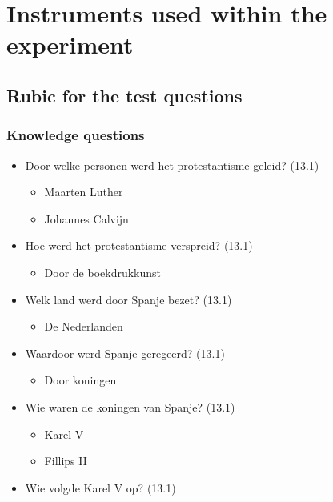 \chapter{Instruments used within the experiment}
\label{app:instruments}

\section{Rubic for the test questions}
\label{sec:rubic}

\subsection{Knowledge questions}\label{knowledge-questions}

\begin{itemize}
\itemsep1pt\parskip0pt
\item
  Door welke personen werd het protestantisme geleid? (13.1)

  \begin{itemize}
  \itemsep1pt\parskip0pt
  \item
    Maarten Luther
  \item
    Johannes Calvijn
  \end{itemize}
\item
  Hoe werd het protestantisme verspreid? (13.1)

  \begin{itemize}
  \itemsep1pt\parskip0pt
  \item
    Door de boekdrukkunst
  \end{itemize}
\item
  Welk land werd door Spanje bezet? (13.1)

  \begin{itemize}
  \itemsep1pt\parskip0pt
  \item
    De Nederlanden
  \end{itemize}
\item
  Waardoor werd Spanje geregeerd? (13.1)

  \begin{itemize}
  \itemsep1pt\parskip0pt
  \item
    Door koningen
  \end{itemize}
\item
  Wie waren de koningen van Spanje? (13.1)

  \begin{itemize}
  \itemsep1pt\parskip0pt
  \item
    Karel V
  \item
    Fillips II
  \end{itemize}
\item
  Wie volgde Karel V op? (13.1)


\end{itemize}
